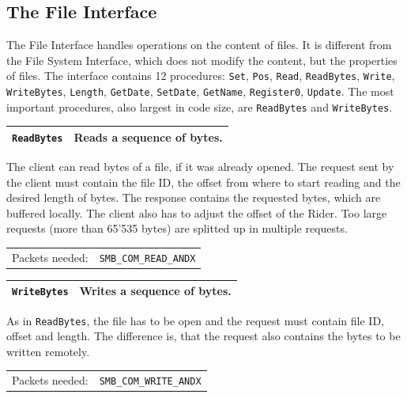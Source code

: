 \documentclass[11pt,a4paper]{book}
\begin{document}
\subsection{The File Interface}
The File Interface handles operations on the content of files. It is different from the File System Interface, which does not modify the content, but the properties of files. The interface contains 12 procedures: \texttt{Set}, \texttt{Pos}, \texttt{Read}, \texttt{ReadBytes}, \texttt{Write}, \texttt{WriteBytes}, \texttt{Length}, \texttt{GetDate}, \texttt{SetDate}, \texttt{GetName}, \texttt{Register0}, \texttt{Update}. The most important procedures, also largest in code size, are \texttt{ReadBytes} and \texttt{WriteBytes}.

\begin{center}
\renewcommand{\tabcolsep}{5mm}
\begin{tabular}{p{3cm}p{8cm}}
\texttt{ReadBytes} & \textbf{Reads a sequence of bytes.} \\ 
\hline
\end{tabular}
\end{center}
The client can read bytes of a file, if it was already opened. The request sent by the client must contain the file ID, the offset from where to start reading and the desired length of bytes. The response contains the requested bytes, which are buffered locally. The client also has to adjust the offset of the Rider. Too large requests (more than 65'535 bytes) are splitted up in multiple requests. \\
\renewcommand{\tabcolsep}{5mm}
\begin{tabular}{p{3cm}p{8cm}}
Packets needed: & \texttt{SMB\_COM\_READ\_ANDX} \\
\end{tabular}

\begin{center}
\renewcommand{\tabcolsep}{5mm}
\begin{tabular}{p{3cm}p{8cm}}
\texttt{WriteBytes} & \textbf{Writes a sequence of bytes.} \\ 
\hline
\end{tabular}
\end{center}
As in \texttt{ReadBytes}, the file has to be open and the request must contain file ID, offset and length. The difference is, that the request also contains the bytes to be written remotely. \\
\renewcommand{\tabcolsep}{5mm}
\begin{tabular}{p{3cm}p{8cm}}
Packets needed: & \texttt{SMB\_COM\_WRITE\_ANDX} \\
\end{tabular} \\
\end{document}
